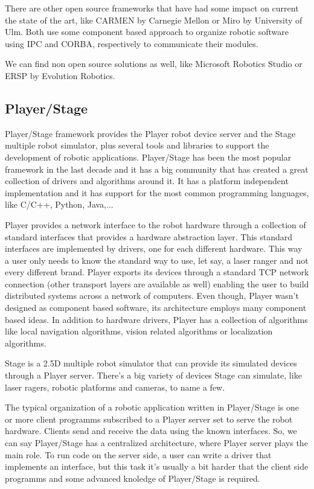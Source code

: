 \documentclass[twocolumn]{svjour3}          %
\begin{document}
There are other open source frameworks that have had some impact on current the state of the art, like CARMEN \cite{montemerlo03} by Carnegie Mellon or Miro \cite{Kraetzschmar02} by University of Ulm. Both use some component based approach to organize robotic software using IPC and CORBA, respectively to communicate their modules.

We can find non open source solutions as well, like Microsoft Robotics Studio or ERSP by Evolution Robotics. 

\subsection{Player/Stage}
Player/Stage framework provides the Player robot device server and the
Stage multiple robot simulator, plus several tools and libraries to support the
development of robotic applications. Player/Stage has been the most
popular framework in the last decade and it has a big community that
has created a great collection of drivers and algorithms around it. It has a platform independent implementation and it has support for the most common programming languages, like C/C++, Python, Java,...

Player provides a network interface to the robot hardware through a collection of standard
interfaces that provides a hardware abstraction layer. This standard interfaces are implemented by drivers, one
for each different hardware. This way a user only needs to know the
standard way to use, let say, a laser ranger and not every different
brand. Player exports its devices through a standard TCP network
connection  (other transport layers are available as well)
enabling the user to build distributed systems across a network of
computers. Even though, Player wasn't designed as component based software, its architecture employs many component based
ideas. In addition to hardware drivers, Player has a collection of algorithms
like local navigation algorithms, vision related algorithms or
localization algorithms. 

Stage is a 2.5D multiple robot simulator that can provide its
simulated devices through a Player server. There's a big variety of
devices Stage can simulate, like laser ragers, robotic platforms and
cameras, to name a few.

The typical organization of a robotic application written in Player/Stage is one or more client programms subscribed to a Player server set to serve the robot hardware. Clients send and receive the data using the known interfaces. So, we can say Player/Stage has a centralized architecture, where Player server plays the main role. To run code on the server side, a user can write a driver that implements an interface, but this task it's usually a bit harder that the client side programms and some advanced knoledge of Player/Stage is required.
\end{document}
